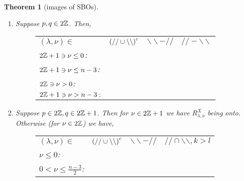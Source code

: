 \documentclass[12pt]{article} %
\newtheorem{theorem}{Theorem}
\theoremstyle{definition}
\theoremstyle{exampstyle} \newtheorem{examp}[theorem]{Theorem}
\newcommand{\even}{2\Z}
\newcommand{\odd}{2\Z+1}
\newcommand{\bb}{\backslash\backslash}
\renewcommand{\ss}{//}
\begin{document}
\begin{theorem}[images of SBOs]
\begin{enumerate}
\begin{figure}[H]
\begin{tabular}{m{3.5cm}ccc}
		\end{tabular}
		\end{figure}
	\item Suppose $p,q\in\even$. Then,
		\begin{figure}[H]
			\hskip-3.6cm\noindent\begin{tabular}{m{3.5cm}ccc}
			$(\lambda,\nu)\in$&$\mybra{\ss\cup\bb}^c$ & $\bb-\ss$  & $\ss-\bb$\\[15pt]
			\vspace{-3cm}$\odd\ni\nu\le0$:&\\[15pt]
			\vspace{-3cm}$\odd\ni\nu\le n-3$:&\\[15pt]
			\vspace{-3cm}$\even\ni\nu>0$:&\\[15pt]
			\vspace{-3cm}$\odd\ni\nu>n-3:$&\\[15pt]
		\end{tabular}
		\end{figure}
	\item Suppose $p\in\even,q\in\odd$. Then for $\nu\in\odd$ we have $R_{\lambda,\nu}^X$ being onto. Otherwise (for $\nu\in\even$) we have,
	  \begin{figure}[H]
	    \hskip-3.6cm\noindent\begin{tabular}{m{3.5cm}ccc}
	      $(\lambda,\nu)\in$&$\left(//\cup\backslash\backslash\right)^c$ & $\backslash\backslash-//$  & $//\cap\backslash\backslash,k> l$\\[15pt]
	      \vspace{-3cm}$\nu\leq0$:&\\[15pt]
	      \vspace{-3cm}$0<\nu\leq\frac{n-3}{2}$:&\\[25pt]

\end{tabular}
\end{figure}
\end{enumerate}
\end{theorem}
\end{document}
